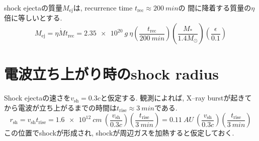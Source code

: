 \documentclass{ltjsarticle}
\newcommand{\Edd}{\mathrm{Edd}}
\newcommand{\Mdot}{\dot{M}}
\begin{document}
shock ejectaの質量$M_\mathrm{ej}$は, recurrence time \( t_\mathrm{rec} \approx \SI{200}{min} \)の
間に降着する質量の$\eta$倍に等しいとする.
\begin{equation}
  M_\mathrm{ej}
  =
  \eta\Mdot t_\mathrm{rec}
  =
  \SI{2.35e20}{g}~\eta
  \left( \frac{t_\mathrm{rec}}{\SI{200}{min}} \right)
  \left( \frac{M_*}{1.4M_\odot} \right)
  \left( \frac{\epsilon}{0.1} \right)
\end{equation}

\section{電波立ち上がり時のshock radius}
Shock ejectaの速さを\(v_\mathrm{sh} = 0.3c\)と仮定する.
観測によれば, X--ray burstが起きてから電波が立ち上がるまでの時間は\( t_\mathrm{rise} \approx \SI{3}{min} \)である.
\begin{equation}
  r_\mathrm{sh} = v_\mathrm{sh}t_\mathrm{rise} 
  =
  \SI{1.6e12}{cm}~\left(\frac{v_\mathrm{sh}}{0.3c}\right)\left( \frac{t_\mathrm{rise}}{\SI{3}{min}} \right)
  =
  \SI{0.11}{AU}~\left(\frac{v_\mathrm{sh}}{0.3c}\right)\left( \frac{t_\mathrm{rise}}{\SI{3}{min}} \right)
\end{equation}
この位置でshockが形成され, shockが周辺ガスを加熱すると仮定しておく.
\end{document}

